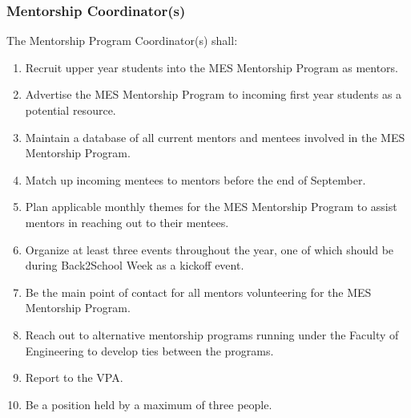 
\subsubsection{Mentorship Coordinator(s)}
\label{mentorship-coordinators}
The Mentorship Program Coordinator(s) shall:

\begin{enumerate}
 \item
  Recruit upper year students into the MES Mentorship Program as mentors.
 \item
  Advertise the MES Mentorship Program to incoming first year students as a potential resource.
 \item
  Maintain a database of all current mentors and mentees involved in the MES Mentorship Program.
 \item
  Match up incoming mentees to mentors before the end of September.
 \item
  Plan applicable monthly themes for the MES Mentorship Program to assist mentors in reaching out to their mentees.
 \item
  Organize at least three events throughout the year, one of which should be during Back2School Week as a kickoff event.
 \item
  Be the main point of contact for all mentors volunteering for the MES Mentorship Program.
 \item
  Reach out to alternative mentorship programs running under the Faculty of Engineering to develop ties between the programs.
 \item
  Report to the VPA.
 \item
  Be a position held by a maximum of three people.

\end{enumerate}